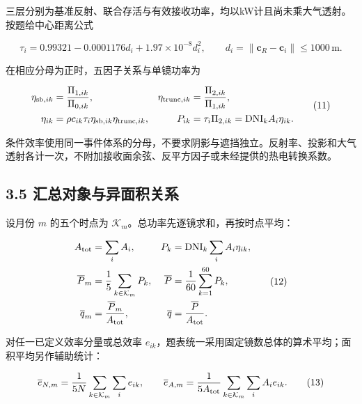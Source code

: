 \documentclass[UTF8,fontset=windows,zihao=-4]{ctexart}
\begin{document}
\par\noindent\begin{minipage}{\linewidth}
三层分别为基准反射、联合存活与有效接收功率，均以kW计且尚未乘大气透射。按题给中心距离公式

\[
\tau_i=0.99321-0.0001176d_i+1.97\times10^{-8}d_i^2,
\qquad d_i=\|\boldsymbol c_R-\boldsymbol c_i\|\le1000\,\mathrm m.
\tag{10}
\]
\end{minipage}\par

\par\noindent\begin{minipage}{\linewidth}
在相应分母为正时，五因子关系与单镜功率为

\[
\begin{aligned}
\eta_{{\rm sb},ik}&=\frac{\Pi_{1,ik}}{\Pi_{0,ik}},
&\eta_{{\rm trunc},ik}&=\frac{\Pi_{2,ik}}{\Pi_{1,ik}},\\
\eta_{ik}&=\rho c_{ik}\tau_i\eta_{{\rm sb},ik}\eta_{{\rm trunc},ik},
&P_{ik}&=\tau_i\Pi_{2,ik}=\mathrm{DNI}_kA_i\eta_{ik}.
\end{aligned}\tag{11}
\]
\end{minipage}\par

条件效率使用同一事件体系的分母，不要求阴影与遮挡独立。反射率、投影和大气透射各计一次，不附加接收面余弦、反平方因子或未经提供的热电转换系数。

\subsection*{3.5 汇总对象与异面积关系}

\par\noindent\begin{minipage}{\linewidth}
设月份 \(m\) 的五个时点为 \(\mathcal K_m\)。总功率先逐镜求和，再按时点平均：

\[
\begin{aligned}
A_{\rm tot}&=\sum_iA_i,&P_k&=\mathrm{DNI}_k\sum_iA_i\eta_{ik},\\
\overline P_m&=\frac15\sum_{k\in\mathcal K_m}P_k,
&\overline P&=\frac1{60}\sum_{k=1}^{60}P_k,\\
\overline q_m&=\frac{\overline P_m}{A_{\rm tot}},
&\overline q&=\frac{\overline P}{A_{\rm tot}}.
\end{aligned}\tag{12}
\]
\end{minipage}\par

\par\noindent\begin{minipage}{\linewidth}
对任一已定义效率分量或总效率 \(e_{ik}\)，题表统一采用固定镜数总体的算术平均；面积平均另作辅助统计：

\[
\overline e_{N,m}=\frac1{5N}\sum_{k\in\mathcal K_m}\sum_i e_{ik},
\qquad
\overline e_{A,m}=\frac1{5A_{\rm tot}}\sum_{k\in\mathcal K_m}\sum_iA_i e_{ik}.
\tag{13}
\]
\end{minipage}\par
\end{document}
